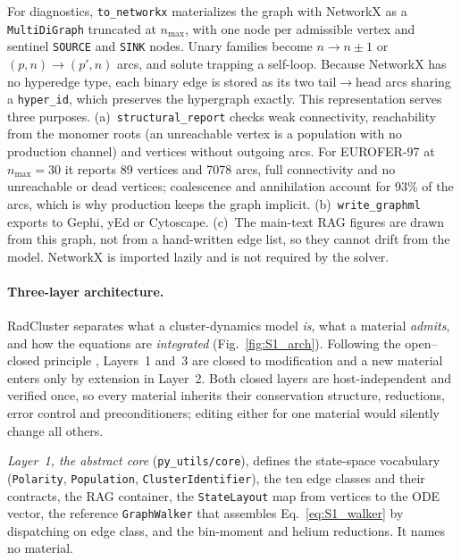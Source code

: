 For diagnostics, \texttt{to\_networkx} materializes the graph with
NetworkX \cite{Hagberg2008} as a \texttt{MultiDiGraph} truncated at
$n_{\max}$, with one node per admissible vertex and sentinel
\texttt{SOURCE} and \texttt{SINK} nodes. Unary families become
$n\to n\pm1$ or $(p,n)\to(p',n)$ arcs, and solute trapping a self-loop.
Because NetworkX has no hyperedge type, each binary edge is stored as its
two tail$\to$head arcs sharing a \texttt{hyper\_id}, which preserves the
hypergraph exactly. This representation serves three purposes.
(a)~\texttt{structural\_report} checks weak connectivity, reachability
from the monomer roots (an unreachable vertex is a population with no
production channel) and vertices without outgoing arcs. For EUROFER-97
at $n_{\max}=30$ it reports 89 vertices and 7078 arcs, full connectivity
and no unreachable or dead vertices; coalescence and annihilation account
for 93\% of the arcs, which is why production keeps the graph implicit.
(b)~\texttt{write\_graphml} exports to Gephi, yEd or Cytoscape.
(c)~The main-text RAG figures are drawn from this graph, not from a
hand-written edge list, so they cannot drift from the model. NetworkX is
imported lazily and is not required by the solver.

\paragraph{Three-layer architecture.}
RadCluster separates what a cluster-dynamics model \emph{is}, what a
material \emph{admits}, and how the equations are \emph{integrated}
(Fig.~\ref{fig:S1_arch}). Following the open--closed principle
\cite{Meyer1988}, Layers~1 and~3 are closed to modification and a new
material enters only by extension in Layer~2. Both closed layers are
host-independent and verified once, so every material inherits their
conservation structure, reductions, error control and preconditioners;
editing either for one material would silently change all others.

\emph{Layer~1, the abstract core} (\texttt{py\_utils/core}), defines the
state-space vocabulary (\texttt{Polarity}, \texttt{Population},
\texttt{ClusterIdentifier}), the ten edge classes and their contracts, the
RAG container, the \texttt{StateLayout} map from vertices to the ODE
vector, the reference \texttt{GraphWalker} that assembles
Eq.~\eqref{eq:S1_walker} by dispatching on edge class, and the bin-moment
and helium reductions. It names no material.

